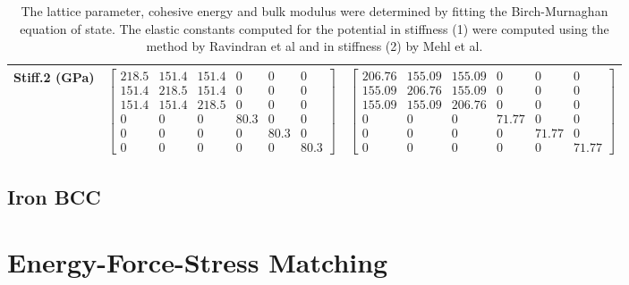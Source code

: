 \begin{table}[ht]
\begin{tabular}{lcccccc}
Stiff.2 (GPa) & \multicolumn{3}{c}{$\begin{bmatrix} 218.5 & 151.4 & 151.4 & 0 & 0 & 0 \\ 151.4 & 218.5 & 151.4 & 0 & 0 & 0 \\ 151.4 & 151.4 & 218.5 & 0 & 0 & 0 \\ 0 & 0 & 0 & 80.3 & 0 & 0 \\ 0 & 0 & 0 & 0 & 80.3 & 0 \\ 0 & 0 & 0 & 0 & 0 & 80.3 \end{bmatrix}$}   & \multicolumn{3}{c}{$\begin{bmatrix} 206.76 & 155.09 & 155.09 & 0 & 0 & 0 \\ 155.09 & 206.76 & 155.09 & 0 & 0 & 0 \\ 155.09 & 155.09 & 206.76 & 0 & 0 & 0 \\ 0 & 0 & 0 & 71.77 & 0 & 0 \\ 0 & 0 & 0 & 0 & 71.77 & 0 \\ 0 & 0 & 0 & 0 & 0 & 71.77 \end{bmatrix}$} \\
\hline\hline
\end{tabular}
\caption{The lattice parameter, cohesive energy and bulk modulus were determined by fitting the Birch-Murnaghan equation of state.  The elastic constants computed for the potential in stiffness (1) were computed using the method by Ravindran et al\cite{dfttisiravindran} and in stiffness (2) by Mehl et al\cite{mehlsp}\cite{elasticpropertiesmehl}.}
\label{table:fedftvspotential}
\end{table}








\clearpage
\FloatBarrier
\subsection{Iron BCC}








\clearpage
\section{Energy-Force-Stress Matching}

